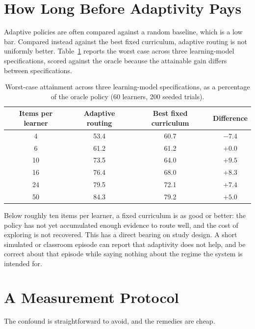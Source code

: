 \documentclass[notitlepage,12pt]{jedm}
\begin{document}
\section{How Long Before Adaptivity Pays}
\label{sec:horizon}

Adaptive policies are often compared against a random baseline, which is a low bar. Compared instead against the best fixed curriculum, adaptive routing is not uniformly better. Table~\ref{tab:horizon} reports the worst case across three learning-model specifications, scored against the oracle because the attainable gain differs between specifications.

\begin{table}[ht]
\centering
\caption{Worst-case attainment across three learning-model specifications, as a percentage of the oracle policy (60 learners, 200 seeded trials).}
\label{tab:horizon}
\begin{tabular}{cccc}
\toprule
Items per learner & Adaptive routing & Best fixed curriculum & Difference \\
\midrule
4  & 53.4 & 60.7 & $-7.4$ \\
6  & 61.2 & 61.2 & $+0.0$ \\
10 & 73.5 & 64.0 & $+9.5$ \\
16 & 76.4 & 68.0 & $+8.3$ \\
24 & 79.5 & 72.1 & $+7.4$ \\
50 & 84.3 & 79.2 & $+5.0$ \\
\bottomrule
\end{tabular}
\end{table}

Below roughly ten items per learner, a fixed curriculum is as good or better: the policy has not yet accumulated enough evidence to route well, and the cost of exploring is not recovered. This has a direct bearing on study design. A short simulated or classroom episode can report that adaptivity does not help, and be correct about that episode while saying nothing about the regime the system is intended for.

\section{A Measurement Protocol}
\label{sec:protocol}

The confound is straightforward to avoid, and the remedies are cheap.
\end{document}
